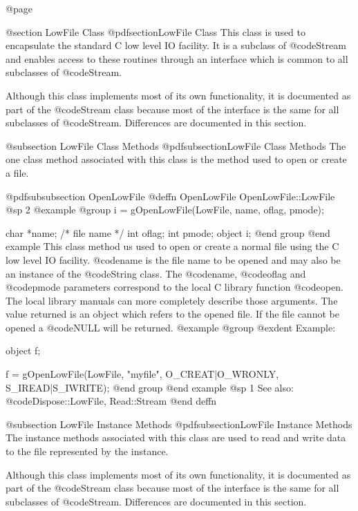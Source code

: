 @page

@section LowFile Class
@pdfsection{LowFile Class}
This class is used to encapsulate the standard C low level IO facility.  It
is a subclass of @code{Stream} and enables access to these routines
through an interface which is common to all subclasses of @code{Stream}.

Although this class implements most of its own functionality, it is
documented as part of the @code{Stream} class because most of the
interface is the same for all subclasses of @code{Stream}.  Differences
are documented in this section.


@subsection LowFile Class Methods
@pdfsubsection{LowFile Class Methods}
The one class method associated with this class is the method used to
open or create a file.




@pdfsubsubsection {OpenLowFile}
@deffn {OpenLowFile} OpenLowFile::LowFile
@sp 2
@example
@group
i = gOpenLowFile(LowFile, name, oflag, pmode);

char    *name;  /*  file name  */
int     oflag;
int     pmode;
object  i;
@end group
@end example
This class method us used to open or create a normal file using the C
low level IO facility.  @code{name} is the file name to be opened and
may also be an instance of the @code{String} class.  The @code{name},
@code{oflag} and @code{pmode} parameters correspond to the local C
library function @code{open}.  The local library manuals can more
completely describe those arguments.  The value returned is an object
which refers to the opened file.  If the file cannot be opened a
@code{NULL} will be returned.
@example
@group
@exdent Example:

object  f;

f = gOpenLowFile(LowFile, "myfile", O_CREAT|O_WRONLY,
                 S_IREAD|S_IWRITE);
@end group
@end example
@sp 1
See also:  @code{Dispose::LowFile, Read::Stream}
@end deffn





@subsection LowFile Instance Methods
@pdfsubsection{LowFile Instance Methods}
The instance methods associated with this class are used to read and write
data to the file represented by the instance.

Although this class implements most of its own functionality, it is
documented as part of the @code{Stream} class because most of the
interface is the same for all subclasses of @code{Stream}.  Differences
are documented in this section.





